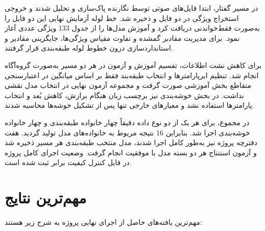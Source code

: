 \documentclass[12pt,a4paper,oneside]{report}
\begin{document}
در مسیر گفتار، ابتدا فایل‌های صوتی توسط نگارنده پاک‌سازی و تحلیل شدند و خروجی استخراج ویژگی در دو فایل
و
ذخیره شد. خط لوله آزمایش نهایی این دو فایل را به‌صورت فقط‌خواندنی دریافت کرد و آموزش مدل‌ها را از جدول 133 ویژگی عددی آغاز نمود. برای مدیریت مقادیر گمشده و تفاوت مقیاس ویژگی‌ها، جایگزینی مقادیر و استانداردسازی درون خطوط لوله طبقه‌بندی قرار گرفتند.

برای کاهش نشت اطلاعات، تقسیم آموزش و آزمون در هر دو مسیر به‌صورت گروه‌آگاه انجام شد. تنظیم ابرپارامترها و انتخاب طبقه‌بند فقط بر اساس میانگین
در اعتبارسنجی متقاطع بخش آموزشی صورت گرفت و مجموعه آزمون نهایی در انتخاب مدل نقشی نداشت. در بخش خوشه‌بندی نیز برچسب زبان هنگام برازش، کاهش بُعد و انتخاب پارامترها استفاده نشد و معیارهای خارجی تنها پس از تشکیل خوشه‌ها محاسبه شدند.

در مجموع، برای هر یک از دو نوع داده دقیقاً چهار خانواده طبقه‌بندی و چهار خانواده خوشه‌بندی اجرا شد. بنابراین 16 نتیجه مربوط به خانواده‌های مدل تولید گردید. هفت دفترچه پروژه نیز به‌طور کامل اجرا شدند، مدل منتخب طبقه‌بندی هر مسیر ذخیره شد و آزمون استنتاج هر دو بسته مدل با موفقیت انجام گرفت. وضعیت اجرای کامل پروژه در فایل کنترل کیفیت برابر
ثبت شده است.


\section{مهم‌ترین نتایج}

مهم‌ترین یافته‌های حاصل از اجرای نهایی پروژه به شرح زیر هستند:
\end{document}
